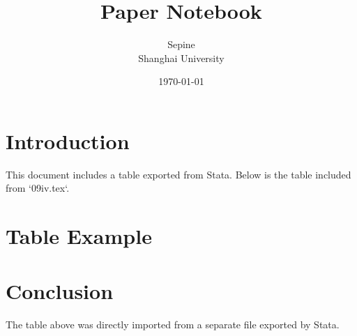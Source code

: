\documentclass[12pt]{article}
\title{Paper Notebook}
\author{Sepine \\ Shanghai University}
\date{\today}
\begin{document}
\maketitle %

\section{Introduction}
This document includes a table exported from Stata. Below is the table included from `09iv.tex`.

\section{Table Example}

\section{Conclusion}
The table above was directly imported from a separate file exported by Stata.
\end{document}
